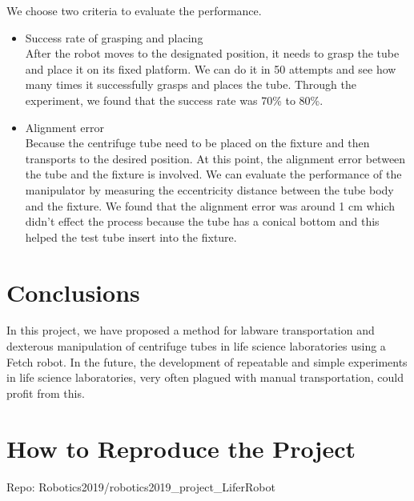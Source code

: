\documentclass[12pt,draftclsnofoot,onecolumn]{IEEEtran}
\begin{document}
    
	We choose two criteria to evaluate the performance.
	\begin{itemize}
		
		\item Success rate of grasping and placing\\
				After the robot moves to the designated position, it needs to grasp the tube and place it on its fixed platform. We can do it in 50 attempts and see how many times it successfully grasps and places the tube. Through the experiment, we found that the success rate was 70\% to 80\%. 
		\item Alignment error\\
		Because the centrifuge tube need to be placed on the fixture and then transports to the desired position. At this point, the alignment error between the tube and the fixture is involved. We can evaluate the performance of the manipulator by measuring the eccentricity distance between the tube body and the fixture. We found that the alignment error was around 1 cm which didn't effect the process because the tube has a conical bottom and this helped the test tube insert into the fixture.
		
	\end{itemize}
	
	\section{Conclusions}
	In this project, we have proposed a method for labware transportation and dexterous manipulation of centrifuge tubes in life science laboratories using a Fetch robot. In the future, the development of repeatable and simple experiments in life science laboratories, very often plagued with manual transportation, could profit from this.
	
	\section{How to Reproduce the Project}
	Repo: Robotics2019/robotics2019\_project\_LiferRobot
	
\end{document}
